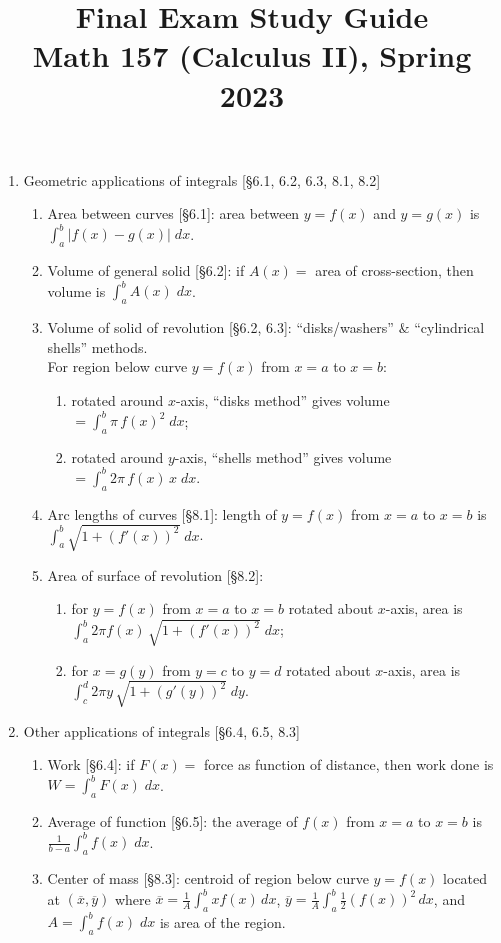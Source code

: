 \documentclass[11pt]{article}
\title{Final Exam Study Guide \\ Math 157 (Calculus II), Spring 2023}
\date{}
\begin{document}
\maketitle

\thispagestyle{empty}

\vspace{-2.4cm}

\begin{enumerate}
\item Geometric applications of integrals [\S6.1, 6.2, 6.3, 8.1, 8.2]
\begin{enumerate}
\item Area between curves [\S6.1]: area between $y=f(x)$ and $y=g(x)$ is $\int_{a}^{b} |f(x)-g(x)| \; dx$.
\item Volume of general solid [\S6.2]: if $A(x)=$ area of cross-section, then volume is $\int_a^b A(x) \;dx$.
\item Volume of solid of revolution [\S6.2, 6.3]: ``disks/washers'' $\&$ ``cylindrical shells'' methods.  \\For region below curve $y=f(x)$ from $x=a$ to $x=b$:
\begin{enumerate}
\item rotated around $x$-axis, ``disks method'' gives volume $=\int_a^b \pi \, f(x)^2 \; dx$;
\item rotated around $y$-axis, ``shells method'' gives volume $=\int_a^b 2 \pi \, f(x) \, x \; dx$.
\end{enumerate}
\item Arc lengths of curves [\S8.1]: length of $y=f(x)$ from $x=a$ to $x=b$ is $\int_{a}^{b} \sqrt{1+(f'(x))^2} \; dx$.
\item Area of surface of revolution [\S8.2]: 
\begin{enumerate}
\item for $y=f(x)$ from $x=a$ to $x=b$ rotated about $x$-axis, area is $\int_{a}^{b} 2\pi f(x) \, \sqrt{1+(f'(x))^2} \; dx$;
\item for $x=g(y)$ from $y=c$ to $y=d$ rotated about $x$-axis, area is $\int_{c}^{d} 2\pi y \, \sqrt{1+(g'(y))^2} \; dy$.
\end{enumerate}
\end{enumerate}

\item Other applications of integrals [\S6.4, 6.5, 8.3]
\begin{enumerate}
\item Work [\S6.4]: if $F(x)=$ force as function of distance, then work done is $W=\int_{a}^{b} F(x) \; dx$.
\item Average of function [\S6.5]: the average of $f(x)$ from $x=a$ to $x=b$ is $\frac{1}{b-a}\int_a^b f(x) \; dx$.
\item Center of mass [\S8.3]: centroid of region below curve $y=f(x)$ located at $(\overline{x},\overline{y})$ where $\overline{x} = \frac{1}{A} \int_a^b xf(x) \, dx$, \; $\overline{y} = \frac{1}{A} \int_{a}^{b} \frac{1}{2} (f(x))^2 \, dx$, \; and $A=\int_{a}^{b} f(x) \; dx$ is area of the region.
\end{enumerate}


\end{enumerate}
\end{document}
